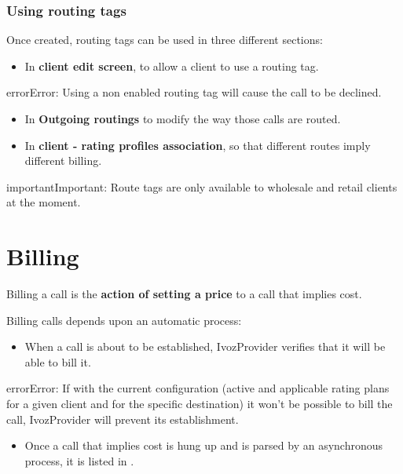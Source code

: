 \documentclass[letterpaper,10pt,english]{sphinxmanual}
\begin{document}
\subsubsection{Using routing tags}
\label{administration_portal/brand/routing/routing_tags:using-routing-tags}
Once created, routing tags can be used in three different sections:
\begin{itemize}
\item {} 
In \textbf{client edit screen}, to allow a client to use a routing tag.

\end{itemize}

\begin{notice}{error}{Error:}
Using a non enabled routing tag will cause the call to be declined.
\end{notice}
\begin{itemize}
\item {} 
In \textbf{Outgoing routings} to modify the way those calls are routed.

\item {} 
In \textbf{client - rating profiles association}, so that different routes imply different billing.

\end{itemize}

\begin{notice}{important}{Important:}
Route tags are only available to wholesale and retail clients at the moment.
\end{notice}


\section{Billing}
\label{administration_portal/brand/billing/index::doc}\label{administration_portal/brand/billing/index:billing}
Billing a call is the \textbf{action of setting a price} to a call that implies cost.

Billing calls depends upon an automatic process:
\begin{itemize}
\item {} 
When a call is about to be established, IvozProvider verifies that it will be able to bill it.

\end{itemize}

\begin{notice}{error}{Error:}
If with the current configuration (active and applicable rating plans for
a given client and for the specific destination) it won't be possible to
bill the call, IvozProvider will prevent its establishment.
\end{notice}
\begin{itemize}
\item {} 
Once a call that implies cost is hung up and is parsed by an asynchronous process, it is listed in {\hyperref[administration_portal/platform/external_calls:external\string-calls]{}}.

\end{itemize}
\end{document}
